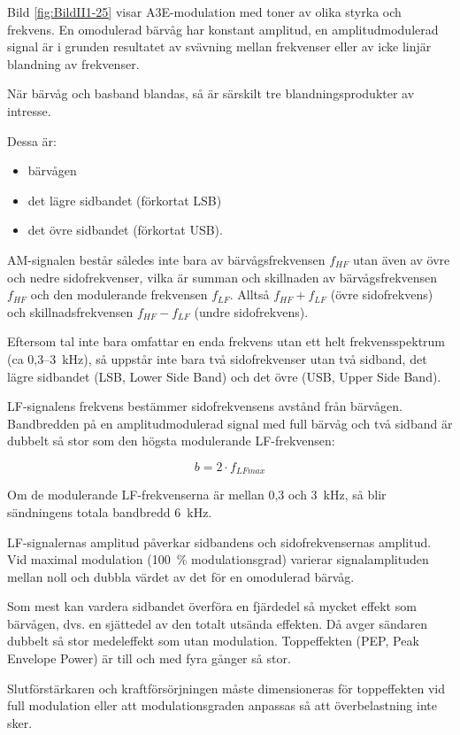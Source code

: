 Bild \ref{fig:BildII1-25} visar A3E-modulation med toner av olika styrka och
frekvens. En omodulerad bärvåg har konstant amplitud, en amplitudmodulerad signal är i grunden resultatet av svävning mellan frekvenser eller av icke linjär blandning av frekvenser.

När bärvåg och basband blandas, så är särskilt tre blandningsprodukter av
intresse.

Dessa är:
\begin{itemize}
\item bärvågen
\item det lägre sidbandet (förkortat LSB)
\item det övre sidbandet (förkortat USB).
\end{itemize}

AM-signalen består således inte bara av bärvågsfrekvensen \(f_{HF}\) utan även
av övre och nedre sidofrekvenser, vilka är summan och skillnaden av
bärvågsfrekvensen \(f_{HF}\) och den modulerande frekvensen \(f_{LF}\).
Alltså \(f_{HF} + f_{LF}\) (övre sidofrekvens) och skillnadsfrekvensen
\(f_{HF} - f_{LF}\) (undre sidofrekvens).

Eftersom tal inte bara omfattar en enda frekvens utan ett helt frekvensspektrum
(ca 0,3--3~kHz), så uppstår inte bara två sidofrekvenser utan två sidband, det
lägre sidbandet (LSB, Lower Side Band) och det övre (USB, Upper Side Band).

LF-signalens frekvens bestämmer sidofrekvensens avstånd från bärvågen.
Bandbredden på en amplitudmodulerad signal med full bärvåg och två sidband är
dubbelt så stor som den högsta modulerande LF-frekvensen:

\[
	b= 2 \cdot f_{LFmax}
\]

Om de modulerande LF-frekvenserna är mellan 0,3 och 3~kHz, så blir sändningens
totala bandbredd 6~kHz.

LF-signalernas amplitud påverkar sidbandens och sidofrekvensernas amplitud.
Vid maximal modulation (100~\% modulationsgrad) varierar signalamplituden mellan
noll och dubbla värdet av det för en omodulerad bärvåg.

Som mest kan vardera sidbandet överföra en fjärdedel så mycket effekt som
bärvågen, dvs. en sjättedel av den totalt utsända effekten.
Då avger sändaren dubbelt så stor medeleffekt som utan modulation.
Toppeffekten (PEP, Peak Envelope Power) är till och med fyra gånger så stor.

Slutförstärkaren och kraftförsörjningen måste dimensioneras för toppeffekten vid
full modulation eller att modulationsgraden anpassas så att överbelastning inte
sker.

